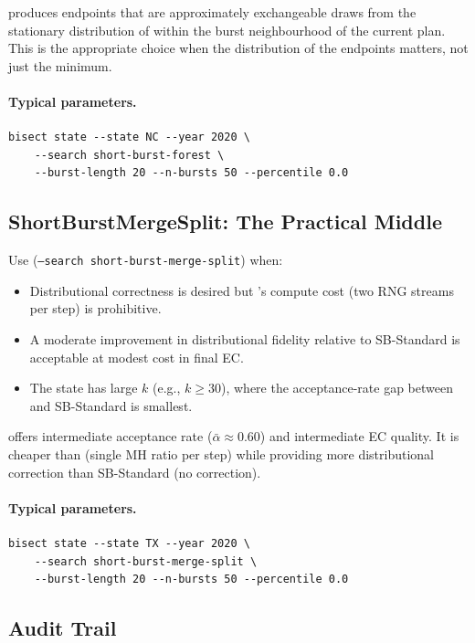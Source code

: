 \sbf{} produces endpoints that are approximately exchangeable draws from
the stationary distribution of \frecom{} within the burst neighbourhood of
the current plan.
This is the appropriate choice when the distribution of the endpoints
matters, not just the minimum.

\paragraph{Typical parameters.}
\begin{verbatim}
bisect state --state NC --year 2020 \
    --search short-burst-forest \
    --burst-length 20 --n-bursts 50 --percentile 0.0
\end{verbatim}

\subsection{ShortBurstMergeSplit: The Practical Middle}

Use \textbf{\sbms{}} (\texttt{--search short-burst-merge-split}) when:
\begin{itemize}
  \item Distributional correctness is desired but \sbf{}'s compute cost
        (two RNG streams per step) is prohibitive.
  \item A moderate improvement in distributional fidelity relative to
        SB-Standard is acceptable at modest cost in final EC.
  \item The state has large $k$ (e.g., $k \geq 30$), where the acceptance-rate
        gap between \sbms{} and SB-Standard is smallest.
\end{itemize}

\sbms{} offers intermediate acceptance rate ($\bar\alpha \approx 0.60$)
and intermediate EC quality.
It is cheaper than \sbf{} (single MH ratio per step) while providing
more distributional correction than SB-Standard (no correction).

\paragraph{Typical parameters.}
\begin{verbatim}
bisect state --state TX --year 2020 \
    --search short-burst-merge-split \
    --burst-length 20 --n-bursts 50 --percentile 0.0
\end{verbatim}

\subsection{Audit Trail}

